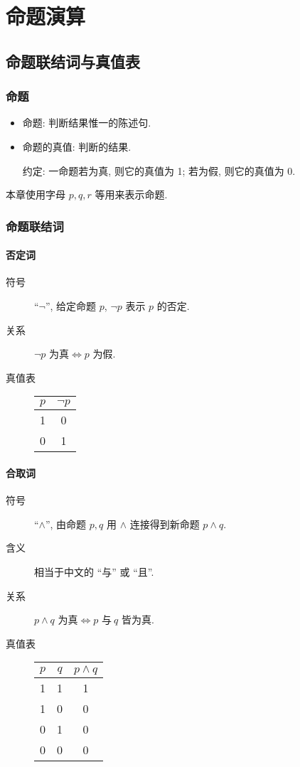 \documentclass[
    color=black,
    device=normal,
    lang=cn
]{elegantnote}
\begin{document}
\section{命题演算}
\subsection{命题联结词与真值表}
\subsubsection{命题}
\begin{itemize}
    \item 命题: 判断结果惟一的陈述句.
    \item 命题的真值: 判断的结果.

          约定: 一命题若为真, 则它的真值为 1; 若为假, 则它的真值为 0.
\end{itemize}
本章使用字母 $p,q,r$ 等用来表示命题.
\subsubsection{命题联结词}
\paragraph{否定词}
\begin{description}
    \item[符号] ``$\lnot$'', 给定命题 $p$, $\lnot p$ 表示 $p$ 的否定.
    \item[关系] $\lnot p\text{ 为真}\Leftrightarrow p\text{ 为假}$.
    \item[真值表]
        \begin{tabular}{c|c}
            $p$ & $\lnot p$ \\
            \hline
            1   & 0         \\
            0   & 1
        \end{tabular}
\end{description}
\paragraph{合取词}
\begin{description}
    \item[符号] ``$\land$'', 由命题 $p,q$ 用 $\land$ 连接得到新命题 $p\land q$.
    \item[含义] 相当于中文的 ``与'' 或 ``且''.
    \item[关系] $p\land q\text{ 为真}\Leftrightarrow p\text{ 与}\ q\text{ 皆为真}$.
    \item[真值表]
        \begin{tabular}{c|c|c}
            $p$ & $q$ & $p\land q$ \\
            \hline
            1   & 1   & 1          \\
            1   & 0   & 0          \\
            0   & 1   & 0          \\
            0   & 0   & 0
        \end{tabular}
\end{description}
\end{document}

